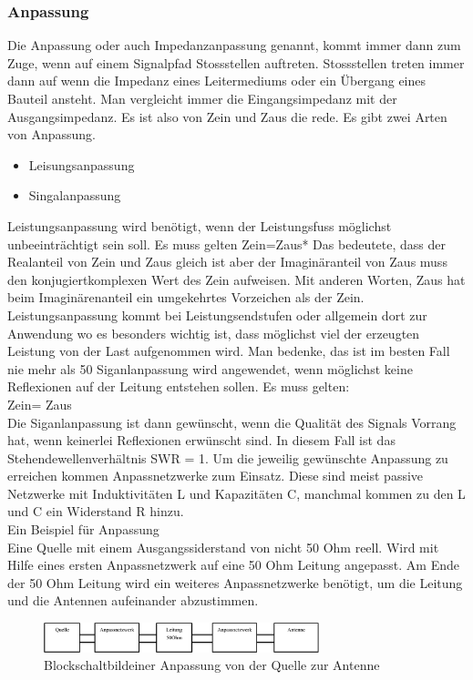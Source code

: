 \subsubsection{Anpassung}
Die Anpassung oder auch Impedanzanpassung genannt, kommt immer dann zum Zuge, wenn auf einem Signalpfad Stossstellen auftreten. Stossstellen treten immer dann auf wenn die Impedanz eines Leitermediums oder ein Übergang eines Bauteil ansteht. 
Man vergleicht immer die Eingangsimpedanz mit der Ausgangsimpedanz. Es ist also von Zein und Zaus die rede.
Es gibt zwei Arten von Anpassung.
\begin{itemize}
\item 	Leisungsanpassung
\item 	Singalanpassung
\end{itemize}
Leistungsanpassung wird benötigt, wenn der Leistungsfuss möglichst unbeeinträchtigt sein soll. Es muss gelten
Zein=Zaus*
Das bedeutete, dass der Realanteil von Zein und Zaus gleich ist aber der Imaginäranteil von Zaus muss den konjugiertkomplexen Wert des Zein aufweisen. Mit anderen Worten, Zaus hat beim Imaginärenanteil ein umgekehrtes Vorzeichen als der Zein. Leistungsanpassung kommt bei Leistungsendstufen oder allgemein dort zur Anwendung wo es besonders wichtig ist, dass möglichst viel der erzeugten Leistung von der Last aufgenommen wird. Man bedenke, das ist im besten Fall nie mehr als 50%
Siganlanpassung wird angewendet, wenn möglichst keine Reflexionen auf der Leitung entstehen sollen. Es muss gelten:\\
Zein= Zaus\\
Die Siganlanpassung ist dann gewünscht, wenn die Qualität des Signals Vorrang hat, wenn keinerlei Reflexionen erwünscht sind. In diesem Fall ist das Stehendewellenverhältnis SWR = 1.
Um die jeweilig gewünschte Anpassung zu erreichen kommen Anpassnetzwerke zum Einsatz. Diese sind meist passive Netzwerke mit Induktivitäten L und Kapazitäten C, manchmal kommen zu den L und C ein Widerstand R hinzu.\\
Ein Beispiel für Anpassung\\
Eine Quelle mit einem Ausgangssiderstand von nicht 50 Ohm reell. Wird mit Hilfe eines ersten Anpassnetzwerk auf eine 50 Ohm Leitung angepasst. Am Ende der 50 Ohm Leitung wird ein weiteres Anpassnetzwerke benötigt, um die Leitung und die Antennen aufeinander abzustimmen.\\
\begin{figure}[!htb]
	\centering
	\includegraphics[width=8cm]{content/bilder/Anpassung.pdf}%
	\caption{Blockschaltbildeiner Anpassung von der Quelle zur Antenne}
	\label{Anpassung}
\end{figure}
